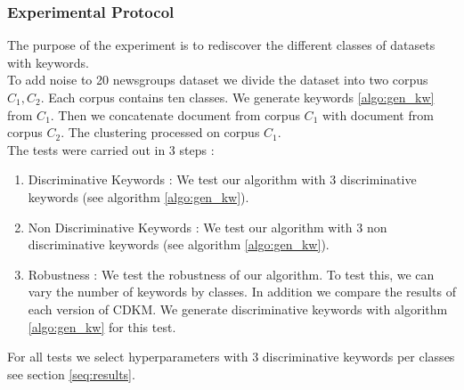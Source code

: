 \subsubsection{\label{seq:protocol}Experimental Protocol}
The purpose of the experiment is to rediscover the different classes of 
datasets with keywords.
\\To add noise to 20 newsgroups dataset we divide the dataset into two corpus 
$C_1, C_2$. Each corpus contains ten classes. We generate keywords 
\ref{algo:gen_kw} from $C_1$. Then we concatenate document from corpus $C_1$
with document from corpus $C_2$. The clustering processed on corpus $C_1$.
\\The tests were carried out in 3 steps :
\begin{enumerate}
\item Discriminative Keywords : We test our algorithm with 3 discriminative 
keywords (see  algorithm \ref{algo:gen_kw}).
\item Non Discriminative Keywords : We test our algorithm with 3 non discriminative 
keywords (see  algorithm \ref{algo:gen_kw}).
\item Robustness : We test the robustness of our algorithm. To test this, we
can vary the number of keywords by classes. In addition we compare
the results of each version of CDKM. We generate discriminative keywords with 
algorithm \ref{algo:gen_kw} for this test.
\end{enumerate}
For all tests we select hyperparameters with 3 discriminative keywords per 
classes see section \ref{seq:results}. 
